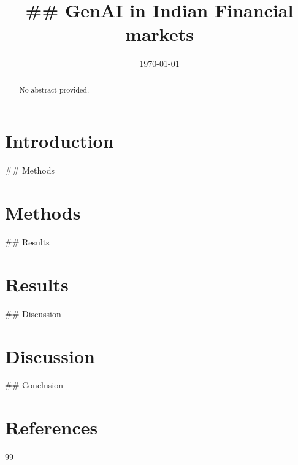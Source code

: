 \documentclass[11pt]{article}
\title{## GenAI in Indian Financial markets}
\author{}
\date{\today}
\begin{document}
\maketitle

\begin{abstract}
No abstract provided.
\end{abstract}

\section*{Introduction}
## Methods

\section*{Methods}
## Results

\section*{Results}
## Discussion

\section*{Discussion}
## Conclusion

\section*{References}
\begin{thebibliography}{99}

\end{thebibliography}
\end{document}

